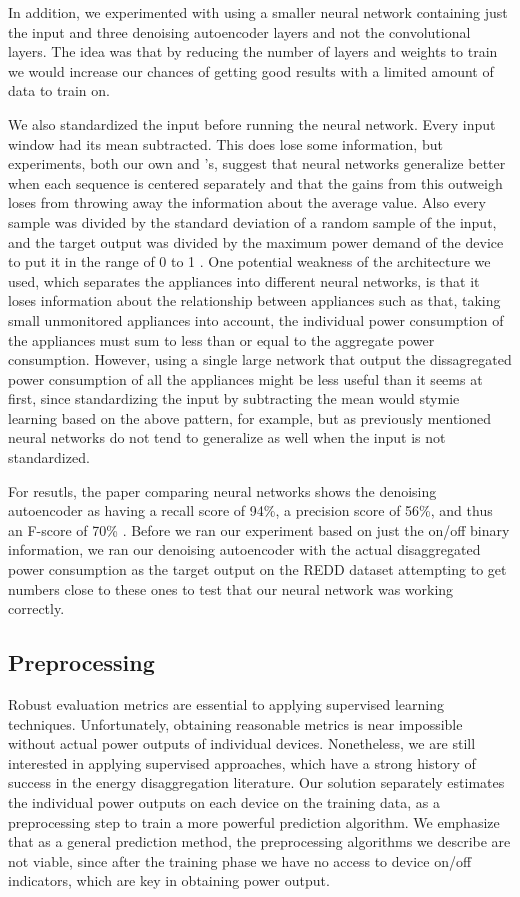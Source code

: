 \documentclass{article}
\begin{document}
In addition, we experimented with using a smaller neural network containing just the input and three denoising autoencoder layers and not the convolutional layers. The idea was that by reducing the number of layers and weights to train we would increase our chances of getting good results with a limited amount of data to train on.

We also standardized the input before running the neural network. Every input window had its mean subtracted. This does lose some information, but experiments, both our own and \cite{Kelly}'s, suggest that neural networks generalize better when each sequence is centered separately and that the gains from this outweigh loses from throwing away the information about the average value. Also every sample was divided by the standard deviation of a random sample of the input, and the target output was divided by the maximum power demand of the device to put it in the range of 0 to 1 \cite{Kelly}. One potential weakness of the architecture we used, which separates the appliances into different neural networks, is that it loses information about the relationship between appliances such as that, taking small unmonitored appliances into account, the individual power consumption of the appliances must sum to less than or equal to the aggregate power consumption. However, using a single large network that output the dissagregated power consumption of all the appliances might be less useful than it seems at first, since standardizing the input by subtracting the mean would stymie learning based on the above pattern, for example, but as previously mentioned neural networks do not tend to generalize as well when the input is not standardized.

For resutls, the paper comparing neural networks shows the denoising autoencoder as having a recall score of 94\%, a precision score of 56\%, and thus an F-score of 70\% \cite{Kelly}. Before we ran our experiment based on just the on/off binary information, we ran our denoising autoencoder with the actual disaggregated power consumption as the target output on the REDD dataset attempting to get numbers close to these ones to test that our neural network was working correctly.

\subsection{Preprocessing}
Robust evaluation metrics are essential to applying supervised learning techniques. Unfortunately, obtaining reasonable metrics is near impossible without actual power outputs of individual devices. Nonetheless, we are still interested in applying supervised approaches, which have a strong history of success in the energy disaggregation literature. Our solution separately estimates the individual power outputs on each device on the training data, as a preprocessing step to train a more powerful prediction algorithm. We emphasize that as a general prediction method, the preprocessing algorithms we describe are not viable, since after the training phase we have no access to device on/off indicators, which are key in obtaining power output.
\end{document}
